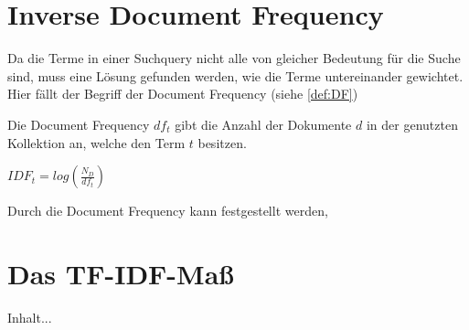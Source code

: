 \section{Inverse Document Frequency}
Da die Terme in einer Suchquery nicht alle von gleicher Bedeutung für die Suche sind, muss eine Lösung gefunden werden, wie die Terme untereinander gewichtet. Hier fällt der Begriff der Document Frequency (siehe \cref{def:DF})

\begin{defi}\label{def:DF}
	Die Document Frequency $df_t$ gibt die Anzahl der Dokumente $d$ in der genutzten Kollektion an, welche den Term $t$ besitzen.
\end{defi}

\begin{defi}\label{def:IDF}
	$IDF_t = log(\frac{N_D}{df_t})$
\end{defi}

Durch die Document Frequency kann festgestellt werden,

\section{Das TF-IDF-Maß}

\begin{defi}[TF-IDF]\label{defi:TF-IDF}
	Inhalt...
\end{defi}